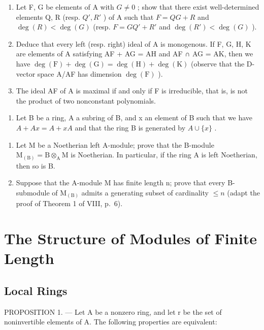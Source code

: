 \begin{enumerate}
\def\labelenumi{\alph{enumi})}
\item
  Let F, G be elements of A with \(G \neq 0\) ; show that there exist well-determined elements Q, R (resp. \(Q', R'\) ) of A such that \(F = QG + R\) and \(\deg(R) < \deg(G)\) (resp. \(F = GQ' + R'\) and \(\deg(R') < \deg(G)\) ).
\item
  Deduce that every left (resp. right) ideal of A is monogenous. If F, G, H, K are elements of A satisfying AF + AG = AH and AF ∩ AG = AK, then we have \(\deg(\mathrm{F}) + \deg(\mathrm{G}) = \deg(\mathrm{H}) + \deg(\mathrm{K})\) (observe that the D-vector space A/AF has dimension \(\deg(\mathrm{F})\) ).
\item
  The ideal AF of A is maximal if and only if F is irreducible, that is, is not the product of two nonconstant polynomials.
\end{enumerate}

\begin{enumerate}
\def\labelenumi{\arabic{enumi})}
\setcounter{enumi}{27}
\tightlist
\item
  Let B be a ring, A a subring of B, and x an element of B such that we have \(A + Ax = A + xA\) and that the ring B is generated by \(A \cup \{x\}\) .
\end{enumerate}

\begin{enumerate}
\def\labelenumi{\alph{enumi})}
\item
  Let M be a Noetherian left A-module; prove that the B-module \(\mathrm{M}_{(\mathrm{B})} = \mathrm{B} \otimes_{\mathrm{A}} \mathrm{M}\) is Noetherian. In particular, if the ring A is left Noetherian, then so is B.
\item
  Suppose that the A-module M has finite length n; prove that every B-submodule of \(\mathrm{M}_{(\mathrm{B})}\) admits a generating subset of cardinality \(\leqslant n\) (adapt the proof of Theorem 1 of VIII, p.~6).
\end{enumerate}

\section{The Structure of Modules of Finite Length}

\subsection{Local Rings}

PROPOSITION 1. --- Let A be a nonzero ring, and let r be the set of noninvertible elements of A. The following properties are equivalent:

